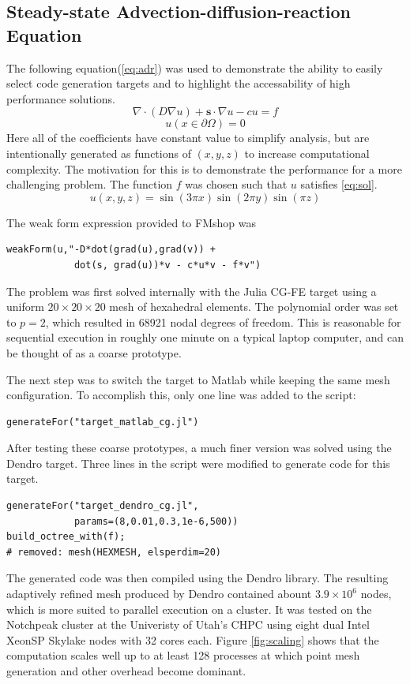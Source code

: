\documentclass[twoside,leqno,twocolumn]{article}
\begin{document}
\subsection{Steady-state Advection-diffusion-reaction Equation}
The following equation(\ref{eq:adr}) was used to demonstrate the ability to easily select code generation targets and to highlight the accessability of high performance solutions. 
\begin{equation}
\label{eq:adr}
\nabla \cdot (D\nabla u) + \textbf{s} \cdot \nabla u - c u = f
\end{equation}
\[
u(x\in \partial \Omega) = 0
\]
Here all of the coefficients have constant value to simplify analysis, but are intentionally generated as functions of $(x,y,z)$ to increase computational complexity. The motivation for this is to demonstrate the performance for a more challenging problem. The function $f$ was chosen such that $u$ satisfies \ref{eq:sol}.
\begin{equation}
\label{eq:sol}
u(x,y,z) = \sin(3\pi x) \sin(2\pi y) \sin(\pi z)
\end{equation}

The weak form expression provided to FMshop was
\begin{verbatim}
weakForm(u,"-D*dot(grad(u),grad(v)) + 
            dot(s, grad(u))*v - c*u*v - f*v")
\end{verbatim}

The problem was first solved internally with the Julia CG-FE target using a uniform $20\times 20\times 20$ mesh of hexahedral elements. The polynomial order was set to $p=2$, which resulted in 68921 nodal degrees of freedom. This is reasonable for sequential execution in roughly one minute on a typical laptop computer, and can be thought of as a coarse prototype.

The next step was to switch the target to Matlab while keeping the same mesh configuration. To accomplish this, only one line was added to the script: \begin{verbatim}
generateFor("target_matlab_cg.jl")
\end{verbatim}
 
After testing these coarse prototypes, a much finer version was solved using the Dendro target. Three lines in the script were modified to generate code for this target. 
\begin{verbatim}
generateFor("target_dendro_cg.jl", 
            params=(8,0.01,0.3,1e-6,500))
build_octree_with(f);
# removed: mesh(HEXMESH, elsperdim=20)
\end{verbatim}
The generated code was then compiled using the Dendro library. The resulting adaptively refined mesh produced by Dendro contained abount $3.9\times 10^{6}$ nodes, which is more suited to parallel execution on a cluster. It was tested on the Notchpeak cluster at the Univeristy of Utah's CHPC using eight dual Intel XeonSP Skylake nodes with 32 cores each. Figure \ref{fig:scaling} shows that the computation scales well up to at least 128 processes at which point mesh generation and other overhead become dominant.
\end{document}
